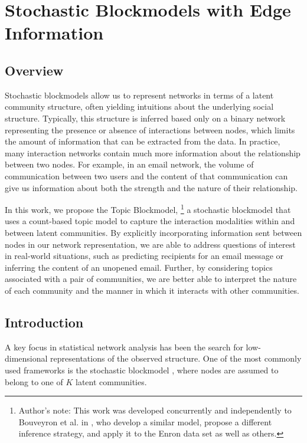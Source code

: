 \chapter{Stochastic Blockmodels with Edge Information}
\label{ch:TopicBlockModel}

\section{Overview}
    Stochastic blockmodels allow us to represent networks in terms of a latent community structure, often yielding intuitions about the underlying social structure. Typically, this structure is inferred based only on a binary network representing the presence or absence of interactions between nodes, which limits the amount of information that can be extracted from the data. In practice, many interaction networks contain much more information about the relationship between two nodes. For example, in an email network, the volume of communication between two users and the content of that communication can give us information about both the strength and the nature of their relationship.

    In this work, we propose the Topic Blockmodel,
        \footnote{Author's note: This work was developed concurrently and independently to Bouveyron et al. in \cite{bouveyron2018stochastic}, who develop a similar model, propose a different inference strategy, and apply it to the Enron data set as well as others.}
    a stochastic blockmodel that uses a count-based topic model to capture the interaction modalities within and between latent communities. By explicitly incorporating information sent between nodes in our network representation, we are able to address questions of interest in real-world situations, such as predicting recipients for an email message or inferring the content of an unopened email. Further, by considering topics associated with a pair of communities, we are better able to interpret the nature of each community and the manner in which it interacts with other communities.  
    
    

\section{Introduction}\label{sec:introduction}

    A key focus in statistical network analysis has been the search for low-dimensional representations of the observed structure. One of the most commonly used frameworks is the stochastic blockmodel \citep{Wang:Wong:1987,Snijders:Nowicki:1997}, where nodes are assumed to belong to one of $K$ latent communities. 
    
